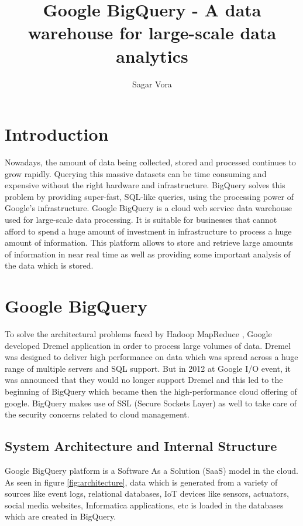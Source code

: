 \documentclass[9pt,twocolumn,twoside]{../../styles/osajnl}
\title{Google BigQuery - A data warehouse for large-scale data analytics}
\author[1]{Sagar Vora}
\affil[1]{School of Informatics and Computing, Bloomington, IN 47408, U.S.A.}
\begin{document}
\maketitle

\section{Introduction}
Nowadays, the amount of data being collected, stored and processed
continues to grow rapidly. Querying this massive datasets can be time
consuming and expensive without the right hardware and
infrastructure. BigQuery \cite{www-bigquery} solves this problem by
providing super-fast, SQL-like queries, using the processing power of
Google's infrastructure. Google BigQuery \cite{bigquery-paper} is a
cloud web service data warehouse used for large-scale data
processing. It is suitable for businesses that cannot afford to spend
a huge amount of investment in infrastructure to process a huge amount
of information. This platform allows to store and retrieve large
amounts of information in near real time as well as providing some
important analysis of the data which is stored.

\section{Google BigQuery}
To solve the architectural problems faced by Hadoop
\cite{www-apache-hadoop} MapReduce \cite{mapreduce-article}, Google
developed Dremel \cite{dremel-paper} application in order to process
large volumes of data. Dremel was designed to deliver high performance
on data which was spread across a huge range of multiple servers and
SQL support. But in 2012 at Google I/O event, it was announced that
they would no longer support Dremel and this led to the beginning of
BigQuery which became then the high-performance cloud offering of
google. BigQuery makes use of SSL (Secure Sockets Layer) as well to
take care of the security concerns related to cloud management.

\subsection{System Architecture and Internal Structure}

Google BigQuery platform is a Software As a Solution (SaaS) model in
the cloud. As seen in figure \ref{fig:architecture}, data which is
generated from a variety of sources like event logs, relational
databases, IoT devices like sensors, actuators, social media websites,
Informatica \cite{www-informatica} applications, etc is loaded in the
databases which are created in BigQuery.
\end{document}

